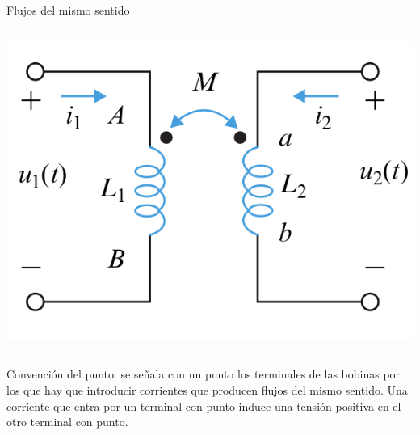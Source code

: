 \documentclass[xcolor={usenames,svgnames,dvipsnames}]{beamer}
\begin{document}
\begin{frame}[label={sec:org7586d4f}]{Flujos del mismo sentido}
\begin{columns}
\begin{column}{0.5\columnwidth}
\begin{center}
\includegraphics[width=.9\linewidth]{figs/Acoplamiento1_circuito.png}
\end{center}
\end{column}
\end{columns}

\alert{Convención del punto}: se señala con un punto los terminales de las
bobinas por los que hay que introducir corrientes que producen flujos
del mismo sentido. Una corriente que entra por un terminal con punto
induce una tensión positiva en el otro terminal con punto.
\end{frame}
\end{document}
